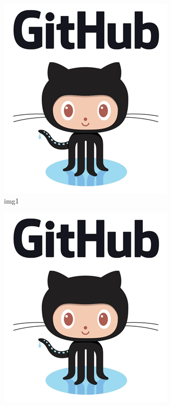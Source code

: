 \documentclass[english]{article}
\begin{document}
\begin{figure}[!htb]
  \begin{subfigure}{.45\textwidth}
    \includegraphics[width=\linewidth]{Images/1.jpg}
    \centering
    \caption{img1}
    \label{fig:1.1}
  \end{subfigure}
  \begin{subfigure}{.45\textwidth}
    \includegraphics[width=\linewidth]{Images/1.jpg}

\end{subfigure}
\end{figure}
\end{document}
